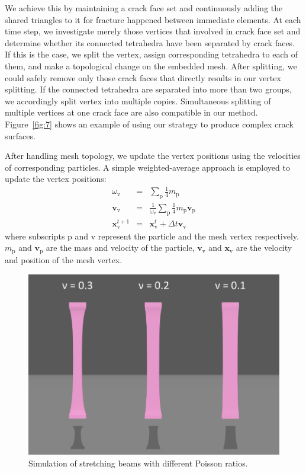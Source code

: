 We achieve this by maintaining a crack face set and continuously adding the shared triangles to it for fracture happened between immediate elements.
At each time step, we investigate merely those vertices that involved in crack face set and determine whether its connected tetrahedra have been separated by crack faces.
If this is the case, we split the vertex, assign corresponding tetrahedra to each of them, and make a topological change on the embedded mesh.
After splitting, we could safely remove only those crack faces that directly results in our vertex splitting.
If the connected tetrahedra are separated into more than two groups, we accordingly split vertex into multiple copies.
Simultaneous splitting of multiple vertices at one crack face are also compatible in our method.
Figure~\ref{fig:7} shows an example of using our strategy to produce complex crack surfaces.

After handling mesh topology, we update the vertex positions using the velocities of corresponding particles.
A simple weighted-average approach is employed to update the vertex positions:
\begin{eqnarray}
\omega_{\mathrm{v}} &=& \sum_{\mathrm{p}} \frac{1}{4}m_{\mathrm{p}}\\
\textbf{v}_{\mathrm{v}} &=& \frac{1}{\omega_{\mathrm{v}}}\sum_{\mathrm{p}}\frac{1}{4}m_{\mathrm{p}}\textbf{v}_{\mathrm{p}}\\
\mathbf{x}_{\mathrm{v}}^{t+1} &=& \mathbf{x}_{\mathrm{v}}^{t} + \Delta t\textbf{v}_{\mathrm{v}}
\end{eqnarray}
where subscripts $\mathrm{p}$ and $\mathrm{v}$ represent the particle and the mesh vertex respectively.
$m_{\mathrm{p}}$ and $\textbf{v}_{\mathrm{p}}$ are the mass and velocity of the particle, $\textbf{v}_{\mathrm{v}}$ and $\textbf{x}_{\mathrm{v}}$ are the velocity and position of the mesh vertex.


\begin{figure}[t]
  \centering
  \includegraphics[width=\linewidth]{../figs/compare_different_poisson_ratio.png}
  \caption{\label{fig:8}
  Simulation of stretching beams with different Poisson ratios.
}
\end{figure}
